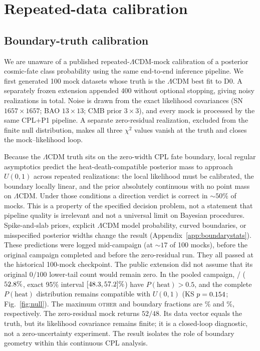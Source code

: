 \documentclass[a4paper,11pt]{article}
\newcommand{\lcdm}{\ensuremath{\Lambda\mathrm{CDM}}}
\begin{document}
\section{Repeated-data calibration}\label{sec:null}
\subsection{Boundary-truth calibration}

We are unaware of a published repeated-\lcdm{}-mock calibration of a posterior
cosmic-fate class probability using the same end-to-end inference pipeline. We
first generated 100 mock datasets whose truth is the \lcdm{} best fit to D0.
A separately frozen extension appended 400 without optional stopping, giving
\NullFiveN{} noisy realizations in total. Noise is drawn from the exact
likelihood covariances (SN $1657\times1657$; BAO $13\times13$; CMB prior
$3\times3$), and every mock is processed by the same CPL+P1 pipeline. A
separate zero-residual realization, excluded from the finite null
distribution, makes all three $\chi^2$ values vanish at the truth and closes
the mock--likelihood loop.

Because the \lcdm{} truth sits on the zero-width CPL fate boundary, local
regular asymptotics predict the heat-death-compatible posterior mass to
approach $U(0,1)$ across repeated realizations: the local likelihood must be
calibrated, the boundary locally linear, and the prior absolutely continuous
with no point mass on \lcdm{}. Under those conditions a direction verdict is correct in
$\sim50\%$ of mocks. This is a property of the specified decision problem,
not a statement that pipeline quality is irrelevant and not a universal
limit on Bayesian procedures. Spike-and-slab priors, explicit \lcdm{} model
probability, curved boundaries, or misspecified posterior widths change the
result (Appendix~\ref{app:boundarystats}).
These predictions were logged mid-campaign (at ${\sim}17$ of 100 mocks),
before the original campaign completed and before the zero-residual run.
They all passed at the historical 100-mock checkpoint. The public extension
did not assume that its original $0/100$ lower-tail count would remain zero.
In the pooled campaign, \NullFiveDirectionK/\NullFiveN{}
($52.8\%$, exact 95\% interval
$[48.3,57.2]\%$) have
$P(\mathrm{heat})>0.5$, and the complete $P(\mathrm{heat})$ distribution
remains compatible with $U(0,1)$ (KS $p=0.154$;
Fig.~\ref{fig:null}). The maximum \textsc{other} and boundary fractions are
\NullFiveOtherMaxPct\% and \NullFiveBoundaryMaxPct\%, respectively.
The zero-residual mock returns $52/48$. Its data vector equals the truth, but
its likelihood covariance remains finite; it is a closed-loop diagnostic,
not a zero-uncertainty experiment. The result isolates the role of boundary
geometry within this continuous CPL analysis.
\end{document}
